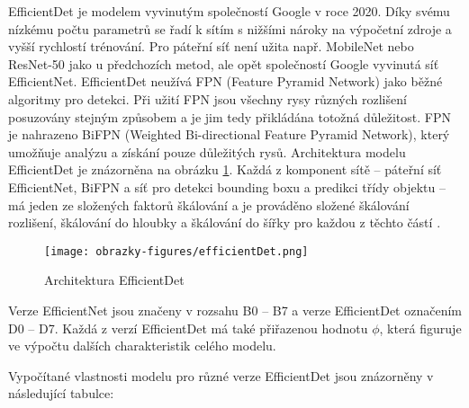 EfficientDet je modelem vyvinutým společností Google v roce 2020. Díky svému nízkému počtu parametrů se řadí k sítím s nižšími nároky na výpočetní zdroje a vyšší rychlostí trénování. Pro páteřní síť není užita např. MobileNet nebo ResNet-50 jako u předchozích metod, ale opět společností Google vyvinutá síť EfficientNet. EfficientDet neužívá FPN (Feature Pyramid Network) jako běžné algoritmy pro detekci. Při užití FPN jsou všechny rysy různých rozlišení posuzovány stejným způsobem a je jim tedy přikládána totožná důležitost. FPN je nahrazeno BiFPN (Weighted Bi-directional Feature Pyramid Network), který umožňuje analýzu a získání pouze důležitých rysů.  Architektura modelu EfficientDet je znázorněna na obrázku \ref{fig:efficientdet}. Každá z komponent sítě -- páteřní síť EfficientNet, BiFPN a síť pro detekci bounding boxu a predikci třídy objektu -- má jeden ze složených faktorů škálování a je prováděno složené škálování rozlišení, škálování do hloubky a škálování do šířky pro každou z těchto částí \cite{EfficientDet, EfficientDetBlog}.

\begin{figure}[!htbp]
    \centering
    \texttt{[image: obrazky-figures/efficientDet.png]}
    \caption{Architektura EfficientDet \cite{EfficientDet}}
    \label{fig:efficientdet}
\end{figure} 

Verze EfficientNet jsou značeny v rozsahu B0 -- B7 a verze EfficientDet označením D0 -- D7. Každá z verzí EfficientDet má také přiřazenou hodnotu $\phi$, která figuruje ve výpočtu dalších charakteristik celého modelu. 

\iffalse
Vypočítané vlastnosti modelu pro různé verze EfficientDet jsou znázorněny v následující tabulce:

